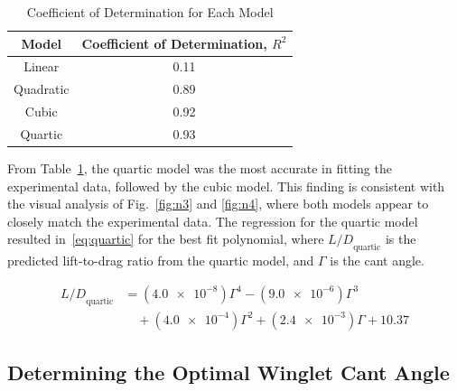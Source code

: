 \documentclass[journal,letterpaper]{IEEEtran}
\renewcommand{\arraystretch}{1.3}
\begin{document}
\begin{table}[H]
    \centering
    \caption{Coefficient of Determination for Each Model}
    \renewcommand{\arraystretch}{1.1}
    \begin{tabular}{cc}
    \toprule
    Model & Coefficient of Determination, $R^2$ \\ \midrule \midrule
    Linear & 0.11 \\
    Quadratic & 0.89 \\
    Cubic & 0.92 \\
    Quartic & 0.93 \\ \bottomrule
    \end{tabular}
    \label{tab:models}
\end{table}

From Table~\ref{tab:models}, the quartic model was the most accurate in fitting the experimental data, followed by the cubic model.
This finding is consistent with the visual analysis of Fig.~\ref{fig:n3} and \ref{fig:n4}, where both models appear to closely match the experimental data.
The regression for the quartic model resulted in~\eqref{eq:quartic} for the best fit polynomial, where ${L/D}_\text{quartic}$ is the predicted lift-to-drag ratio from the quartic model, and $\Gamma$ is the cant angle.

\begin{equation} \label{eq:quartic}
    \begin{split}
        {L/D}_\text{quartic} &= (\num{4.0e-8})\Gamma^4 - (\num{9.0e-6})\Gamma^3 \\
        &\quad + (\num{4.0e-4})\Gamma^2 + (\num{2.4e-3})\Gamma + 10.37
    \end{split}
\end{equation}

\subsection{Determining the Optimal Winglet Cant Angle}
\end{document}
